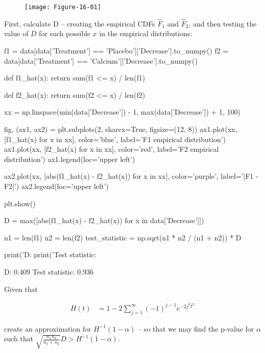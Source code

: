 \begin{figure}[H]
\centering
\texttt{[image: Figure-16-01]}
\end{figure}

First,  calculate D -- creating the empirical CDFs \(\hat{F}_{1}\)
and \(\hat{F}_{2}\), and then testing the value of \(D\) for each possible
\(x\) in the empirical distributions:

\begin{python}
f1 = data[data['Treatment'] == 'Placebo']['Decrease'].to_{n}umpy()
f2 = data[data['Treatment'] == 'Calcium']['Decrease'].to_{n}umpy()

def f1_hat(x):
    return sum(f1 <= x) / len(f1)

def f2_hat(x):
    return sum(f2 <= x) / len(f2)

xx = np.linspace(min(data['Decrease']) - 1, max(data['Decrease']) + 1, 100)

fig, (ax1, ax2) = plt.subplots(2, sharex=True, figsize=(12, 8))
ax1.plot(xx, [f1_hat(x) for x in xx], color='blue', label='F1 empirical distribution')
ax1.plot(xx, [f2_hat(x) for x in xx], color='red', label='F2 empirical distribution')
ax1.legend(loc='upper left')

ax2.plot(xx, [abs(f1_hat(x) - f2_hat(x)) for x in xx], color='purple', label='|F1 - F2|')
ax2.legend(loc='upper left')

plt.show()
\end{python}

\begin{python}
D = max([abs(f1_hat(x) - f2_hat(x)) for x in data['Decrease']])

n1 = len(f1)
n2 = len(f2)
test_statistic = np.sqrt(n1 * n2 / (n1 + n2)) * D

print('D: %
print('Test statistic: %
\end{python}

\begin{console}
D: 0.409
Test statistic: 0.936
\end{console}

Given that

\begin{align*}
H(t) &= 1 - 2 \sum_{j=1}^{\infty} (-1)^{j-1} e^{-2j^{2}t^{2}}
\end{align*}

 create an approximation for \(H^{-1}(1 - \alpha)\) -- so that we
may find the p-value for \(\alpha\) such that $
\sqrt{\frac{n_{1} n_{2}}{n_{1} + n_{2}}} D > H^{-1}(1 -
\alpha) $.

